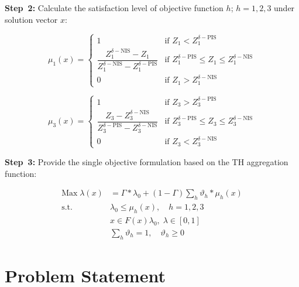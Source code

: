 \documentclass[10pt,twocolumn]{article}
\begin{document}
\textbf{Step~2:} Calculate the satisfaction level of objective
function $h$; $h = 1, 2, 3$ under solution vector $x$:

\begin{equation}
\mu_1(x) = \begin{cases}
  1 & \text{if } Z_1 < Z_1^{\delta-\text{PIS}} \\[4pt]
  \dfrac{Z_1^{\delta-\text{NIS}} - Z_1}
        {Z_1^{\delta-\text{NIS}} - Z_1^{\delta-\text{PIS}}}
    & \text{if } Z_1^{\delta-\text{PIS}} \le Z_1 \le Z_1^{\delta-\text{NIS}}\\[6pt]
  0 & \text{if } Z_1 > Z_1^{\delta-\text{NIS}}
\end{cases}
\label{eq:mu1}
\end{equation}

\begin{equation}
\mu_3(x) = \begin{cases}
  1 & \text{if } Z_3 > Z_3^{\delta-\text{PIS}} \\[4pt]
  \dfrac{Z_3 - Z_3^{\delta-\text{NIS}}}
        {Z_3^{\delta-\text{PIS}} - Z_3^{\delta-\text{NIS}}}
    & \text{if } Z_3^{\delta-\text{PIS}} \le Z_3 \le Z_3^{\delta-\text{NIS}}\\[6pt]
  0 & \text{if } Z_3 < Z_3^{\delta-\text{NIS}}
\end{cases}
\label{eq:mu3}
\end{equation}

\textbf{Step~3:} Provide the single objective formulation based on
the TH aggregation function:

\begin{equation}
\begin{aligned}
  \text{Max}\;\lambda(x) &= \Gamma * \lambda_0 + (1-\Gamma)
    \sum_h \vartheta_h * \mu_h(x) \\
  \text{s.t.} \quad
    &\lambda_0 \le \mu_h(x),\quad h = 1,2,3 \\
    &x \in F(x)\lambda_0,\;\lambda \in [0,1] \\
    &\sum_h \vartheta_h = 1,\quad \vartheta_h \ge 0
\end{aligned}
\label{eq:th}
\end{equation}

\section{Problem Statement}
\end{document}
